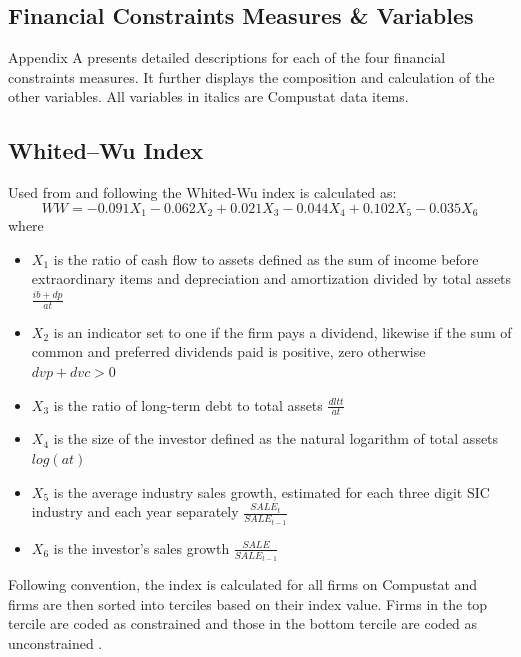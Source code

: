 \documentclass[12pt]{article}
\newcounter{savepage}
\begin{document}
\pagebreak
\cleardoublepage
{}
\setcounter{page}{\thesavepage}
\begin{appendices}
\renewcommand{\appendixname}{Appendix}

	\section{Financial Constraints Measures \& Variables}
\noindent Appendix A presents detailed descriptions for each of the four financial constraints measures. It further displays the composition and calculation of the other variables. All variables in italics are Compustat data items. 
	\subsection*{Whited--Wu Index}
	\noindent Used from \citet[p.543]{Whited2006} and following \citet[p.38]{Farre-mensa2013} the Whited-Wu index is calculated as:
		\begin{equation*}
		WW=-0.091X_{1}-0.062X_{2}+0.021X_{3}-0.044X_{4}+0.102X_{5}-0.035X_{6}
		\end{equation*}
	where
	\begin{itemize}
	\renewcommand\labelitemi{}
		\item $X_{1}$ is the ratio of cash flow to assets defined as the sum of income before extraordinary items and depreciation and amortization divided by total assets $\frac{ib+dp}{at}$
		\item $X_{2}$ is an indicator set to one if the firm pays a dividend, likewise if the sum of common and preferred dividends paid is positive, zero otherwise $dvp+dvc>0$
		\item $X_{3}$ is the ratio of long-term debt to total assets $\frac{dltt}{at}$
		\item $X_{4}$ is the size of the investor defined as the natural logarithm of total assets $log(at)$
		\item $X_{5}$ is the average industry sales growth, estimated for each three digit SIC industry and each year separately $\frac{SALE_{t}}{SALE_{t-1}}$
		\item $X_{6}$ is the investor's sales growth $\frac{SALE}{SALE_{t-1}}$
	\end{itemize}

	\noindent Following convention, the index is calculated for all firms on Compustat and firms are then sorted into terciles based on their index value. Firms in the top tercile are coded as constrained and those in the bottom tercile are coded as unconstrained \citep[p.38]{Farre-mensa2013}. 


\end{appendices}
\end{document}
